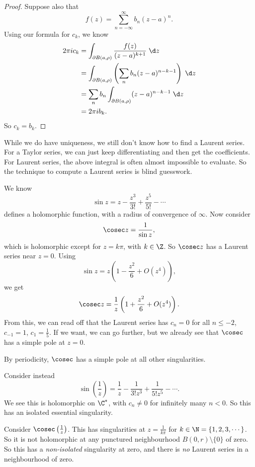 \documentclass[a4paper]{article}
\begin{document}
\begin{proof}
  Suppose also that
  \[
    f(z) = \sum_{n = -\infty}^\infty b_n (z - a)^n.
  \]
  Using our formula for $c_k$, we know
  \begin{align*}
    2\pi i c_k &= \int_{\partial B(a, \rho)} \frac{f(z)}{(z - a)^{k + 1}} \;\d z \\
    &= \int_{\partial B(a, \rho)} \left(\sum_n b_n (z - a)^{n - k - 1}\right)\;\d z\\
    &= \sum_n b_n \int_{\partial B(a, \rho)} (z - a)^{n - k - 1}\;\d z\\
    &= 2\pi i b_k.
  \end{align*}
  So $c_k = b_k$.
\end{proof}
While we do have uniqueness, we still don't know how to find a Laurent series. For a Taylor series, we can just keep differentiating and then get the coefficients. For Laurent series, the above integral is often almost impossible to evaluate. So the technique to compute a Laurent series is blind guesswork.

\begin{eg}
  We know
  \[
    \sin z = z - \frac{z^3}{3!} + \frac{z^5}{5!} - \cdots
  \]
  defines a holomorphic function, with a radius of convergence of $\infty$. Now consider
  \[
    \cosec z = \frac{1}{\sin z},
  \]
  which is holomorphic except for $z = k\pi$, with $k \in \Z$. So $\cosec z$ has a Laurent series near $z = 0$. Using
  \[
    \sin z = z\left(1 - \frac{z^2}{6} + O(z^4)\right),
  \]
  we get
  \[
    \cosec z = \frac{1}{z} \left(1 + \frac{z^2}{6} + O(z^4)\right).
  \]
  From this, we can read off that the Laurent series has $c_n = 0$ for all $n \leq -2$, $c_{-1} = 1$, $c_1 = \frac{1}{5}$. If we want, we can go further, but we already see that $\cosec$ has a simple pole at $z = 0$.

  By periodicity, $\cosec$ has a simple pole at all other singularities.
\end{eg}

\begin{eg}
  Consider instead
  \[
    \sin \left(\frac{1}{z}\right) = \frac{1}{z} - \frac{1}{3! z^3} + \frac{1}{5! z^5} - \cdots.
  \]
  We see this is holomorphic on $\C^*$, with $c_n \not= 0$ for infinitely many $n < 0$. So this has an isolated essential singularity.
\end{eg}

\begin{eg}
  Consider $\cosec \left(\frac{1}{z}\right)$. This has singularities at $z = \frac{1}{k\pi}$ for $k \in \N = \{1, 2, 3, \cdots\}$. So it is not holomorphic at any punctured neighbourhood $B(0, r)\setminus \{0\}$ of zero. So this has a \emph{non-isolated} singularity at zero, and there is \emph{no} Laurent series in a neighbourhood of zero.
\end{eg}
\end{document}
